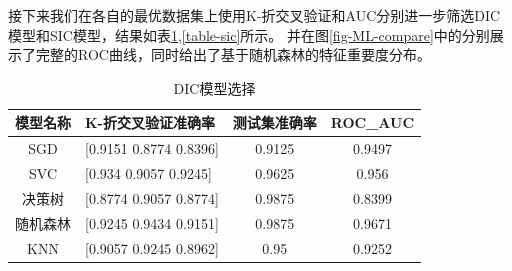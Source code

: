 \documentclass[12pt, a4paper, oneside]{ctexart}
\numberwithin{equation}{section}  %
\begin{document}
接下来我们在各自的最优数据集上使用K-折交叉验证和AUC分别进一步筛选DIC模型和SIC模型，结果如表\ref{table-dic},\ref{table-sic}所示。
并在图\ref{fig-ML-compare}中的分别展示了完整的ROC曲线，同时给出了基于随机森林的特征重要度分布。
\vspace{-0.5em}
\begin{table}[H] %
    \centering %
\begin{tabular}{clcc}
    \toprule
\textbf{模型名称} & \textbf{K-折交叉验证准确率}        & \textbf{测试集准确率} & \textbf{ROC\_AUC} \\
    \midrule
SGD           & {[}0.9151 0.8774 0.8396{]} & 0.9125          & 0.9497            \\
SVC           & {[}0.934  0.9057 0.9245{]} & 0.9625          & 0.956             \\
决策树           & {[}0.8774 0.9057 0.8774{]} & 0.9875          & 0.8399            \\
随机森林          & {[}0.9245 0.9434 0.9151{]} & 0.9875          & 0.9671            \\
KNN           & {[}0.9057 0.9245 0.8962{]} & 0.95            & 0.9252           \\
    \bottomrule
\end{tabular}
    \caption{DIC模型选择}
    \label{table-dic}
\end{table}
\end{document}
